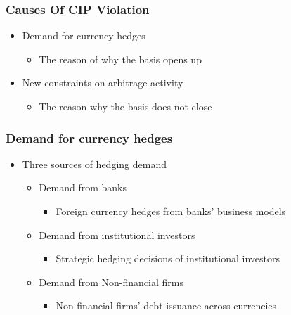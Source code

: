 \subsubsection{Causes Of CIP Violation}
\begin{itemize}
\item Demand for currency hedges
    \begin{itemize}
    \item The reason of why the basis opens up
    \end{itemize}
\item New constraints on arbitrage activity
    \begin{itemize}
    \item The reason why the basis does not close
    \end{itemize}
\end{itemize}


\subsubsection{Demand for currency hedges}
\begin{itemize}
\item Three sources of hedging demand
    \begin{itemize}
    \item Demand from banks
        \begin{itemize}
        \item Foreign currency hedges from banks' business models
        \end{itemize}
    \item Demand from institutional investors
        \begin{itemize}
        \item Strategic hedging decisions of institutional investors
        \end{itemize}
    \item Demand from Non-financial firms
        \begin{itemize}
        \item Non-financial firms' debt issuance across currencies
        \end{itemize}
    \end{itemize}
\end{itemize}




